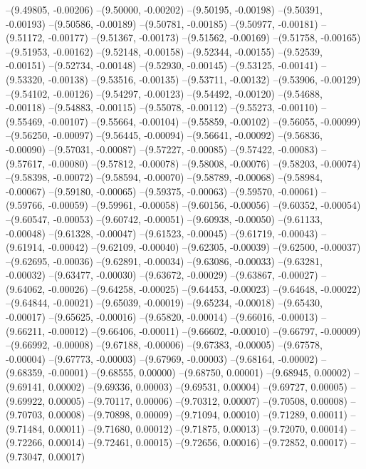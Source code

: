 --(9.49805, -0.00206)
--(9.50000, -0.00202)
--(9.50195, -0.00198)
--(9.50391, -0.00193)
--(9.50586, -0.00189)
--(9.50781, -0.00185)
--(9.50977, -0.00181)
--(9.51172, -0.00177)
--(9.51367, -0.00173)
--(9.51562, -0.00169)
--(9.51758, -0.00165)
--(9.51953, -0.00162)
--(9.52148, -0.00158)
--(9.52344, -0.00155)
--(9.52539, -0.00151)
--(9.52734, -0.00148)
--(9.52930, -0.00145)
--(9.53125, -0.00141)
--(9.53320, -0.00138)
--(9.53516, -0.00135)
--(9.53711, -0.00132)
--(9.53906, -0.00129)
--(9.54102, -0.00126)
--(9.54297, -0.00123)
--(9.54492, -0.00120)
--(9.54688, -0.00118)
--(9.54883, -0.00115)
--(9.55078, -0.00112)
--(9.55273, -0.00110)
--(9.55469, -0.00107)
--(9.55664, -0.00104)
--(9.55859, -0.00102)
--(9.56055, -0.00099)
--(9.56250, -0.00097)
--(9.56445, -0.00094)
--(9.56641, -0.00092)
--(9.56836, -0.00090)
--(9.57031, -0.00087)
--(9.57227, -0.00085)
--(9.57422, -0.00083)
--(9.57617, -0.00080)
--(9.57812, -0.00078)
--(9.58008, -0.00076)
--(9.58203, -0.00074)
--(9.58398, -0.00072)
--(9.58594, -0.00070)
--(9.58789, -0.00068)
--(9.58984, -0.00067)
--(9.59180, -0.00065)
--(9.59375, -0.00063)
--(9.59570, -0.00061)
--(9.59766, -0.00059)
--(9.59961, -0.00058)
--(9.60156, -0.00056)
--(9.60352, -0.00054)
--(9.60547, -0.00053)
--(9.60742, -0.00051)
--(9.60938, -0.00050)
--(9.61133, -0.00048)
--(9.61328, -0.00047)
--(9.61523, -0.00045)
--(9.61719, -0.00043)
--(9.61914, -0.00042)
--(9.62109, -0.00040)
--(9.62305, -0.00039)
--(9.62500, -0.00037)
--(9.62695, -0.00036)
--(9.62891, -0.00034)
--(9.63086, -0.00033)
--(9.63281, -0.00032)
--(9.63477, -0.00030)
--(9.63672, -0.00029)
--(9.63867, -0.00027)
--(9.64062, -0.00026)
--(9.64258, -0.00025)
--(9.64453, -0.00023)
--(9.64648, -0.00022)
--(9.64844, -0.00021)
--(9.65039, -0.00019)
--(9.65234, -0.00018)
--(9.65430, -0.00017)
--(9.65625, -0.00016)
--(9.65820, -0.00014)
--(9.66016, -0.00013)
--(9.66211, -0.00012)
--(9.66406, -0.00011)
--(9.66602, -0.00010)
--(9.66797, -0.00009)
--(9.66992, -0.00008)
--(9.67188, -0.00006)
--(9.67383, -0.00005)
--(9.67578, -0.00004)
--(9.67773, -0.00003)
--(9.67969, -0.00003)
--(9.68164, -0.00002)
--(9.68359, -0.00001)
--(9.68555, 0.00000)
--(9.68750, 0.00001)
--(9.68945, 0.00002)
--(9.69141, 0.00002)
--(9.69336, 0.00003)
--(9.69531, 0.00004)
--(9.69727, 0.00005)
--(9.69922, 0.00005)
--(9.70117, 0.00006)
--(9.70312, 0.00007)
--(9.70508, 0.00008)
--(9.70703, 0.00008)
--(9.70898, 0.00009)
--(9.71094, 0.00010)
--(9.71289, 0.00011)
--(9.71484, 0.00011)
--(9.71680, 0.00012)
--(9.71875, 0.00013)
--(9.72070, 0.00014)
--(9.72266, 0.00014)
--(9.72461, 0.00015)
--(9.72656, 0.00016)
--(9.72852, 0.00017)
--(9.73047, 0.00017)
